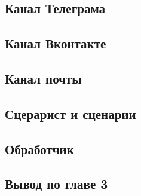     \subsection{Канал Телеграма}
    \subsection{Канал Вконтакте}
    \subsection{Канал почты}
    \subsection{Сцерарист и сценарии}
    \subsection{Обработчик}
    \subsection*{Вывод по главе 3}
